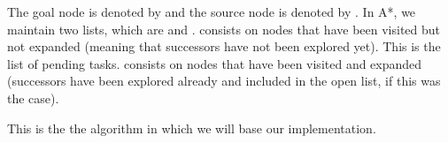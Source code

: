 The goal node is denoted by  and the source node is denoted by . In A*, we maintain two lists, which are  and .  consists on nodes that have been visited but not expanded (meaning that successors have not been explored yet). This is the list of pending tasks.
 consists on nodes that have been visited and expanded (successors have been explored already and included in the open list, if this was the case).

\bigskip
This is the the algorithm in which we will base our implementation.

